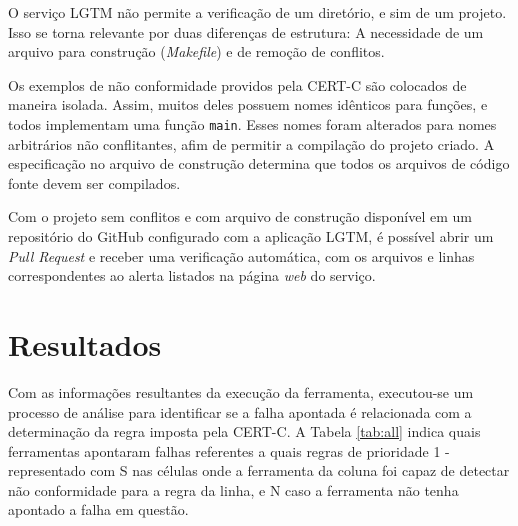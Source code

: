 O serviço LGTM não permite a verificação de um diretório, e sim de um projeto. Isso se torna relevante por duas diferenças de estrutura: A necessidade de um arquivo para construção (\textit{Makefile}) e de remoção de conflitos.

Os exemplos de não conformidade providos pela CERT-C são colocados de maneira isolada. Assim, muitos deles possuem nomes idênticos para funções, e todos implementam uma função \texttt{main}. Esses nomes foram alterados para nomes arbitrários não conflitantes, afim de permitir a compilação do projeto criado. A especificação no arquivo de construção determina que todos os arquivos de código fonte devem ser compilados.

Com o projeto sem conflitos e com arquivo de construção disponível em um repositório do GitHub configurado com a aplicação LGTM, é possível abrir um \textit{Pull Request} e receber uma verificação automática, com os arquivos e linhas correspondentes ao alerta listados na página \textit{web} do serviço.


\section{Resultados}
Com as informações resultantes da execução da ferramenta, executou-se um processo de análise para identificar se a falha apontada é relacionada com a determinação da regra imposta pela CERT-C. A Tabela \ref{tab:all} indica quais ferramentas apontaram falhas referentes a quais regras de prioridade 1 - representado com S nas células onde a ferramenta da coluna foi capaz de detectar não conformidade para a regra da linha, e N caso a ferramenta não tenha apontado a falha em questão.

